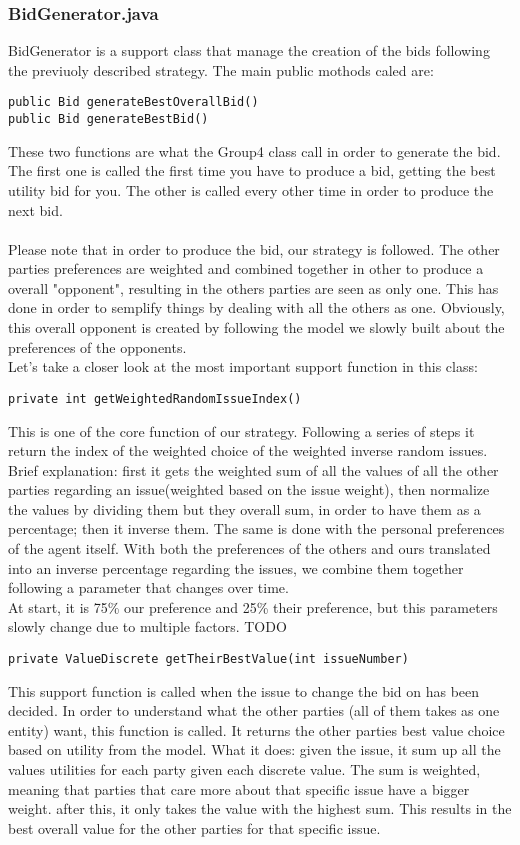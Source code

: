 \documentclass[a4,11pt]{scrartcl}
\begin{document}
\subsubsection{BidGenerator.java}
BidGenerator is a support class that manage the creation of the bids following the previuoly described strategy. 
The main public mothods caled are:
\begin{lstlisting}
public Bid generateBestOverallBid()
public Bid generateBestBid()
\end{lstlisting}
These two functions are what the Group4 class call in order to generate the bid. The first one is called the first time you have to produce a bid, getting the best utility bid for you. The other is called every other time in order to produce the next bid. \\ \\
Please note that in order to produce the bid, our strategy is followed. The other parties preferences are weighted and combined together in other to produce a overall "opponent", resulting in the others parties are seen as only one. This has done in order to semplify things by dealing with all the others as one. Obviously, this overall opponent is created by following the model we slowly built about the preferences  of the opponents.  \\ 
Let's take a closer look at the most important support function in this class:
\begin{lstlisting}
private int getWeightedRandomIssueIndex()
\end{lstlisting}
This is one of the core function of our strategy. Following a series of steps it return the index of the weighted choice of the weighted inverse random issues.\\ Brief explanation: first it gets the weighted sum of all the values of all the other parties regarding an issue(weighted based on the issue weight),  then normalize the values by dividing  them but they overall sum, in order to have them as a percentage; then it inverse them. The same is done with the personal preferences of the agent itself. With both the preferences of the others and ours translated into an inverse percentage regarding the issues, we combine them together following a parameter that changes over time. \\At start, it is 75\% our preference and 25\%  their preference, but this parameters slowly change due to multiple factors. TODO 
\begin{lstlisting}
private ValueDiscrete getTheirBestValue(int issueNumber)
\end{lstlisting}
This support function is called when the issue to change the bid on has been decided. In order to understand what the other parties (all of them takes as one entity) want, this function is called. It returns the other parties best value choice based on utility from the model. What it does: given the issue, it sum up all the values utilities for each party given each discrete value. The sum is weighted, meaning that parties that care more about that specific issue have a bigger weight. after this, it only takes the value with the highest sum. This results in the best overall value for the other parties for that specific issue.   
\end{document}
